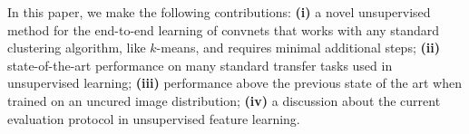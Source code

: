 In this paper, we make the following contributions:
\textbf{(i)} a novel unsupervised method for the end-to-end learning of convnets that works with any standard clustering algorithm, like $k$-means, and requires minimal additional steps;
\textbf{(ii)} state-of-the-art performance on many standard transfer tasks used in unsupervised learning;
\textbf{(iii)} performance above the previous state of the art when trained on an uncured image distribution;
\textbf{(iv)} a discussion about the current evaluation protocol in unsupervised feature learning.

